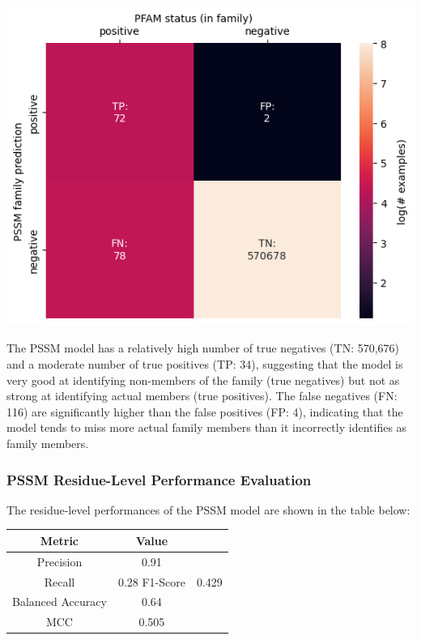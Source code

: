 \documentclass[10pt,twocolumn,letterpaper]{article}
\begin{document}
\begin{center}
    \includegraphics[scale=0.4]{img/pssm_protein_level_eval.png}
\end{center}

The PSSM model has a relatively high number of true negatives (TN: 570,676) and a moderate number of true positives (TP: 34), suggesting that the model is very good at identifying non-members of the family (true negatives) but not as strong at identifying actual members (true positives). The false negatives (FN: 116) are significantly higher than the false positives (FP: 4), indicating that the model tends to miss more actual family members than it incorrectly identifies as family members.

\subsubsection{PSSM Residue-Level Performance Evaluation}

The residue-level performances of the PSSM model are shown in the table below:


\begin{center}
    \begin{tabular}{ccc}
        \toprule
        Metric & Value \\
        \midrule
        Precision & 0.91 \\
        Recall & 0.28
        F1-Score & 0.429 \\
        Balanced Accuracy & 0.64 \\
        MCC & 0.505 \\
        \bottomrule
    \end{tabular}
\end{center} 
\end{document}
